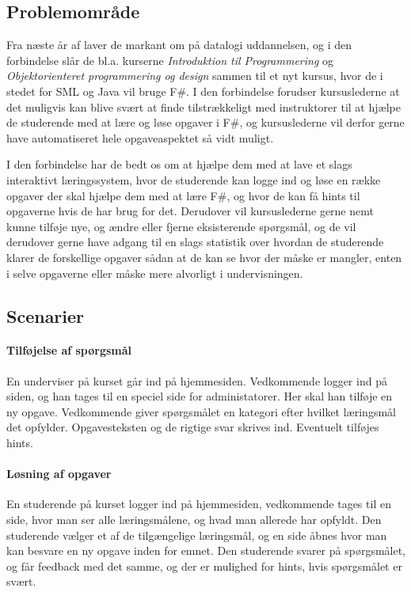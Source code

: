 \documentclass[12pt]{article}
\begin{document}
\subsection{Problemområde}
Fra næste år af laver de markant om på datalogi uddannelsen, og i den forbindelse slår de bl.a. kurserne \emph{Introduktion til Programmering} og \emph{Objektorienteret programmering og design} sammen til et nyt kursus, hvor de i stedet for SML og Java vil bruge F\#.
I den forbindelse forudser kursuslederne at det muligvis kan blive svært at finde tilstrækkeligt med instruktorer til at hjælpe de studerende med at lære og løse opgaver i F\#, og kursuslederne vil derfor gerne have automatiseret hele opgaveaspektet så vidt muligt.

I den forbindelse har de bedt os om at hjælpe dem med at lave et slags interaktivt læringssystem, hvor de studerende kan logge ind og løse en række opgaver der skal hjælpe dem med at lære F\#, og hvor de kan få hints til opgaverne hvis de har brug for det. Derudover vil kursuslederne gerne nemt kunne tilføje nye, og ændre eller fjerne eksisterende spørgsmål, og de vil derudover gerne have adgang til en slags statistik over hvordan de studerende klarer de forskellige opgaver sådan at de kan se hvor der måske er mangler, enten i selve opgaverne eller måske mere alvorligt i undervisningen.

\subsection{Scenarier}
\paragraph{Tilføjelse af spørgsmål}
En underviser på kurset går ind på hjemmesiden. Vedkommende logger ind på siden, og han tages til en speciel side for administatorer.
Her skal han tilføje en ny opgave. Vedkommende giver spørgsmålet en kategori efter hvilket læringsmål det opfylder. Opgavesteksten og de rigtige svar skrives ind. Eventuelt tilføjes hints.

\paragraph{Løsning af opgaver}
En studerende på kurset logger ind på hjemmesiden, vedkommende tages til en side, hvor man ser alle læringsmålene, og hvad man allerede har opfyldt. Den studerende vælger et af de tilgængelige læringsmål, og en side åbnes hvor man kan besvare en ny opgave inden for emnet. Den studerende svarer på spørgsmålet, og får feedback med det samme, og der er mulighed for hints, hvis spørgsmålet er svært.
\end{document}
